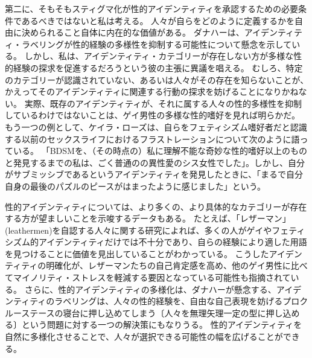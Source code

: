\documentclass[paper=a4,book,openany]{jlreq}
\begin{document}
第二に、そもそもスティグマ化が性的アイデンティティを承認するための必要条件であるべきではないと私は考える。
人々が自らをどのように定義するかを自由に決められること自体に内在的な価値がある。
ダナハーは、アイデンティティ・ラベリングが性的経験の多様性を抑制する可能性について懸念を示している。
しかし、私は、アイデンティティ・カテゴリーが存在しない方が多様な性的経験の探求を促進するだろうという彼の主張に異議を唱える。
むしろ、特定のカテゴリーが認識されていない、あるいは人々がその存在を知らないことが、かえってそのアイデンティティに関連する行動の探求を妨げることになりかねない。
実際、既存のアイデンティティが、それに属する人々の性的多様性を抑制しているわけではないことは、ゲイ男性の多様な性的嗜好を見れば明らかだ。
もう一つの例として、ケイラ・ローズは、自らをフェティシズム嗜好者だと認識する以前のセックスライフにおけるフラストレーションについて次のように語っている。
「BDSMを、（その時点の）私に理解不能な奇妙な性的嗜好以上のものと発見するまでの私は、ごく普通のの異性愛のシス女性でした」。しかし、自分がサブミッシブであるというアイデンティティを発見したときに、「まるで自分自身の最後のパズルのピースがはまったように感じました」という\citep{lords:sexual_submission}。

性的アイデンティティについては、より多くの、より具体的なカテゴリーが存在する方が望ましいことを示唆するデータもある。
たとえば、「レザーマン」(leathermen)を自認する人々に関する研究によれば、多くの人がゲイやフェティシズム的アイデンティティだけでは不十分であり、自らの経験により適した用語を見つけることに価値を見出していることがわかっている\citep{kamel80:_leath}。
こうしたアイデンティティの明確化が、レザーマンたちの自己肯定感を高め、他のゲイ男性に比べてマイノリティ・ストレスを軽減する要因となっている可能性も指摘されている\citep{mosher16:_layer_leath,tatum16:_proxim_minor_stres_proces_subjec}。
さらに、性的アイデンティティの多様化は、ダナハーが懸念する、アイデンティティのラベリングは、人々の性的経験を、自由な自己表現を妨げるプロクルーステースの寝台に押し込めてしまう〔人々を無理矢理一定の型に押し込める〕という問題に対する一つの解決策にもなりうる。
性的アイデンティティを自然に多様化させることで、人々が選択できる可能性の幅を広げることができる。
\end{document}
